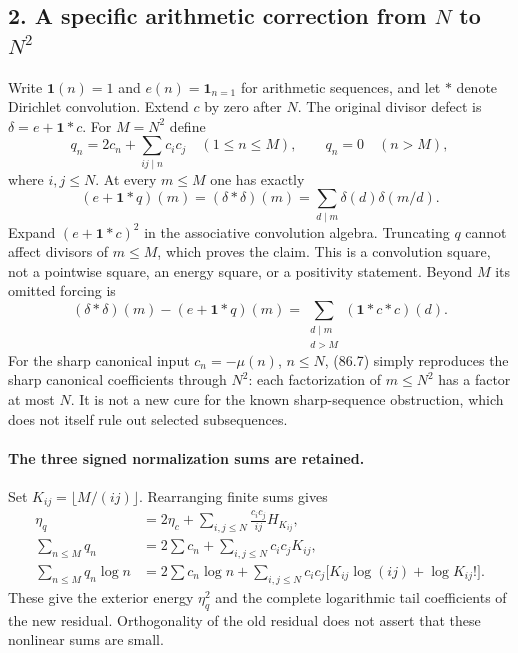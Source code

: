 \subsection*{2. A specific arithmetic correction from $N$ to $N^2$}
Write $\mathbf1(n)=1$ and $e(n)=\mathbf1_{n=1}$ for arithmetic sequences,
and let $*$ denote Dirichlet convolution. Extend $c$ by zero after $N$.
The original divisor defect is $\delta=e+\mathbf1*c$. For $M=N^2$ define
\begin{equation}
 q_n=2c_n+\sum_{ij\mid n}c_i c_j\quad(1\leq n\leq M),\qquad
 q_n=0\quad(n>M),
 \tag{86.6}
\end{equation}
where $i,j\leq N$. At every $m\leq M$ one has exactly
\begin{equation}
 (e+\mathbf1*q)(m)=(\delta*\delta)(m)
                 =\sum_{d\mid m}\delta(d)\delta(m/d).
 \tag{86.7}
\end{equation}
Expand $(e+\mathbf1*c)^2$ in the associative convolution algebra.
Truncating $q$ cannot affect divisors of $m\leq M$, which proves the claim.
This is a convolution square, not a pointwise square, an energy square,
or a positivity statement. Beyond $M$ its omitted forcing is
\[
 (\delta*\delta)(m)-(e+\mathbf1*q)(m)
 =\sum_{\substack{d\mid m\\d>M}}(\mathbf1*c*c)(d).
\]
For the sharp canonical input $c_n=-\mu(n)$, $n\leq N$, (86.7) simply
reproduces the sharp canonical coefficients through $N^2$: each factorization
of $m\leq N^2$ has a factor at most $N$. It is not a new cure for the known
sharp-sequence obstruction, which does not itself rule out selected subsequences.

\paragraph{The three signed normalization sums are retained.}
Set $K_{ij}=\lfloor M/(ij)\rfloor$. Rearranging finite sums gives
\begin{align*}
 \eta_q&=2\eta_c+\sum_{i,j\leq N}\frac{c_ic_j}{ij}H_{K_{ij}},\\
 \sum_{n\leq M}q_n&=2\sum c_n+\sum_{i,j\leq N}c_ic_jK_{ij},\\
 \sum_{n\leq M}q_n\log n
 &=2\sum c_n\log n+
   \sum_{i,j\leq N}c_ic_j\bigl[K_{ij}\log(ij)+\log K_{ij}!\bigr].
\end{align*}
These give the exterior energy $\eta_q^2$ and the complete logarithmic
tail coefficients of the new residual. Orthogonality of the old residual
does not assert that these nonlinear sums are small.

